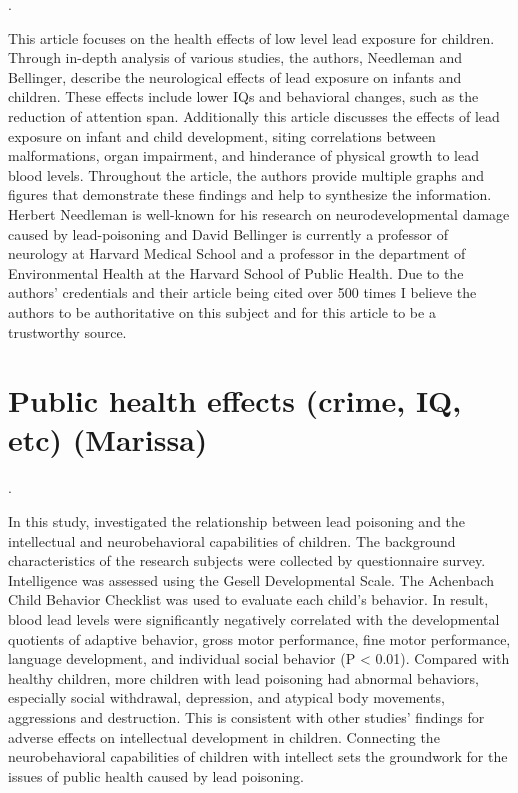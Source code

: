 \documentclass{article}
\begin{document}
\bigskip

. 

\bigskip

This article focuses on the health effects of low level lead exposure for children. Through in-depth analysis of various studies, the authors, Needleman and Bellinger, describe the neurological effects of lead exposure on infants and children. These effects include lower IQs and behavioral changes, such as the reduction of attention span. Additionally this article discusses the effects of lead exposure on infant and child development, siting correlations between malformations, organ impairment, and hinderance of physical growth to lead blood levels. Throughout the article, the authors provide multiple graphs and figures that demonstrate these findings and help to synthesize the information. Herbert Needleman is well-known for his research on neurodevelopmental damage caused by lead-poisoning and David Bellinger is currently a professor of neurology at Harvard Medical School and a professor in the department of Environmental Health at the Harvard School of Public Health. Due to the authors’ credentials and their article being cited over 500 times I believe the authors to be authoritative on this subject and for this article to be a trustworthy source. 

\section{Public health effects (crime, IQ, etc) (Marissa)}

\noindent {}. 

\medskip

In this study, \cite{Hou2013} investigated the relationship between lead poisoning and the intellectual and neurobehavioral capabilities of children. The background characteristics of the research subjects were collected by questionnaire survey. Intelligence was assessed using the Gesell Developmental Scale. The Achenbach Child Behavior Checklist was used to evaluate each child’s behavior. In result, blood lead levels were significantly negatively correlated with the developmental quotients of adaptive behavior, gross motor performance, fine motor performance, language development, and individual social behavior (P < 0.01). Compared with healthy children, more children with lead poisoning had abnormal behaviors, especially social withdrawal, depression, and atypical body movements, aggressions and destruction. This is consistent with other studies’ findings for adverse effects on intellectual development in children. Connecting the neurobehavioral capabilities of children with intellect sets the groundwork for the issues of public health caused by lead poisoning.
\end{document}

